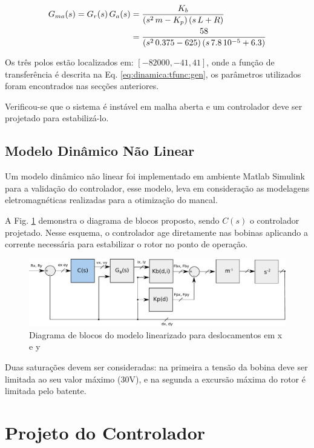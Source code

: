 \begin{align}
	G_{ma}(s) = G_r(s) \, G_a(s) &= \frac{K_b}{(s^2 \, m - K_p) \, (s\, L + R)}	\label{eq:dinamica:tfunc:gen}  \\
	&= \frac{58}{(s^2 \, 0.375 - 625) \, (s\, 7.8 \, 10^{-5} + 6.3)}
	 \notag
\end{align}
 

Os três polos estão localizados em: $[-82000, -41, 41]	$, onde a função de transferência é descrita na Eq. \eqref{eq:dinamica:tfunc:gen}, os parâmetros utilizados foram encontrados nas secções anteriores. 

Verificou-se que o sistema é instável em malha aberta e um controlador deve ser projetado para estabilizá-lo. 

\subsection{Modelo Dinâmico Não Linear}

Um modelo dinâmico não linear foi implementado em ambiente Matlab Simulink para a validação do controlador, esse modelo, leva em consideração as modelagens eletromagnéticas realizadas para a otimização do mancal.

A Fig. \ref{fig:diagrama:blocos:modelo:linear} demonstra o diagrama de blocos proposto, sendo $C(s)$ o controlador projetado. Nesse esquema, o controlador age diretamente nas bobinas aplicando a corrente necessária para estabilizar o rotor no ponto de operação. 

\begin{figure}[th!]
	\centering
	\includegraphics[width=1\linewidth]{../Figs/Modelagem/diagrama_blocos_modelo_linear}
	\caption{Diagrama de blocos do modelo linearizado para deslocamentos em x e y}
	\label{fig:diagrama:blocos:modelo:linear}
\end{figure}

Duas saturações devem ser consideradas: na primeira a tensão da bobina deve ser limitada ao seu valor máximo (30V), e na segunda a excursão máxima do rotor é limitada pelo batente.

\section{Projeto do Controlador}

